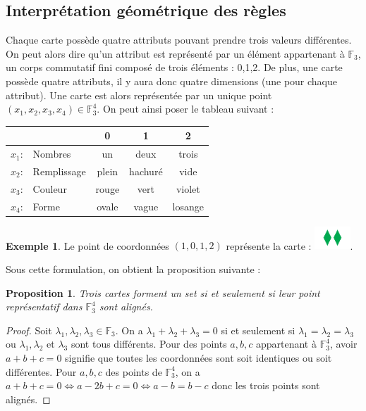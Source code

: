 \documentclass[a4paper,12pt,titlepage]{article}
\theoremstyle{plain}
\newtheorem{prop}{Proposition}
\newcommand{\Ftrois}[1]{\mathbb{F}^#1_3}
\theoremstyle{definition}
\newtheorem{ex}{Exemple}
\begin{document}
\subsection{Interprétation géométrique des règles}
Chaque carte possède quatre attributs pouvant prendre trois valeurs différentes. On peut alors dire qu'un attribut est représenté par un élément appartenant  à $\mathbb{F}_3$, un corps commutatif fini composé de trois éléments : 0,1,2.
De plus, une carte possède quatre attributs, il y aura donc quatre dimensions (une pour chaque attribut). Une carte est alors représentée par un unique point $(x_1,x_2,x_3,x_4) \in \Ftrois{4}$.
On peut ainsi poser le tableau suivant :

\begin{center}
\begin{tabular}{r l | c c c }
 & & 0 & 1 & 2 \\
\hline
$x_1$: & Nombres     & un		& deux	  & trois 	\\
$x_2$: & Remplissage & plein 	& hachuré & vide 	\\
$x_3$: & Couleur     & rouge	& vert	  & violet 	\\
$x_4$: & Forme       & ovale	& vague	  & losange \\
\end{tabular}
\end{center}

\begin{ex}
Le point de coordonnées $(1,0,1,2)$ représente la carte : \includegraphics[width=0.1\textwidth]{Img/1012.png}.
\end{ex}

Sous cette formulation, on obtient la proposition suivante :
\begin{prop}
Trois cartes forment un set si et seulement si leur point représentatif dans  $\Ftrois{4}$ sont alignés.
\end{prop}
\begin{proof}
Soit $\lambda_1,\lambda_2,\lambda_3 \in \mathbb{F}_3$. On a $\lambda_1 + \lambda_2 + \lambda_3 = 0$ si et seulement si $\lambda_1=\lambda_2=\lambda_3$ ou $\lambda_1,\lambda_2$ et $\lambda_3$ sont tous différents. Pour des points $a,b,c$ appartenant à  $\Ftrois{4}$, avoir $a+b+c=0$ signifie que toutes les coordonnées sont soit identiques ou soit différentes.
Pour $a,b,c$ des points de  $\Ftrois{4}$, on a $a+b+c=0 \iff a-2b+c=0 \iff a-b=b-c$ donc les trois points sont alignés.
\end{proof}
\end{document}
